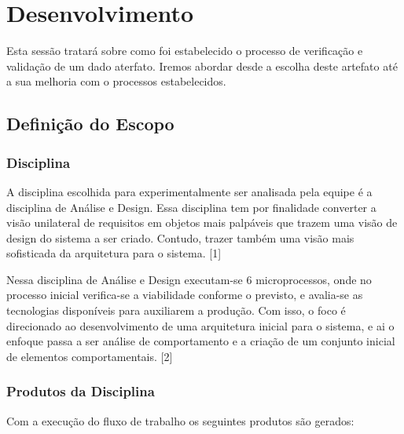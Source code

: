 \chapter[Desenvolvimento ]{Desenvolvimento}
Esta sessão tratará sobre como foi estabelecido o processo de verificação e
validação de um dado aterfato. Iremos abordar desde a escolha deste artefato até
a sua melhoria com o processos estabelecidos.
\section{Definição do Escopo}
\subsection{Disciplina }

A disciplina escolhida para experimentalmente ser analisada pela equipe é a disciplina de Análise e Design. Essa disciplina tem por finalidade converter a visão unilateral de requisitos em objetos mais palpáveis que trazem uma visão de design do sistema a ser criado. Contudo, trazer também uma visão mais sofisticada da arquitetura para o sistema. [1] 

Nessa disciplina de Análise e Design executam-se 6 microprocessos, onde no processo inicial verifica-se a viabilidade conforme o previsto, e avalia-se as tecnologias disponíveis para auxiliarem a produção. Com isso, o foco é direcionado ao desenvolvimento de uma arquitetura inicial para o sistema, e ai o enfoque passa a ser análise de comportamento e a criação de um conjunto inicial de elementos comportamentais. [2]

\subsection{Produtos da Disciplina}
Com a execução do fluxo de trabalho os seguintes produtos são gerados: 

